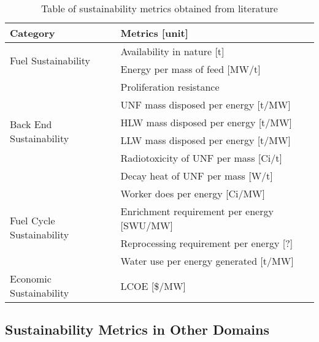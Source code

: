 \documentclass{article}
\begin{document}
\begin{table}[h]
    \centering
    \begin{tabularx}{\textwidth}{lb}

    \hline

    \textbf{Category} & \textbf{Metrics [unit]} \\

    \hline
    \hline

    \multirow{2}{*}{Fuel Sustainability} 
     & Availability in nature [t] \\
     & Energy per mass of feed [MW/t] \\
    
    \hline

    \multirow{6}{*}{Back End Sustainability} 
     & Proliferation resistance \\
     & \gls{UNF} mass disposed per energy [t/MW] \\
     & \gls{HLW} mass disposed per energy [t/MW] \\
     & \gls{LLW} mass disposed per energy [t/MW] \\
     & Radiotoxicity of \gls{UNF} per mass [Ci/t] \\
     & Decay heat of \gls{UNF} per mass [W/t] \\

    \hline

    \multirow{4}{*}{Fuel Cycle Sustainability}
     & Worker does per energy [Ci/MW] \\
     & Enrichment requirement per energy [SWU/MW] \\
     & Reprocessing requirement per energy [?] \\
     & Water use per energy generated [t/MW] \\
    \hline

    Economic Sustainability
     & \gls{LCOE} [\$/MW] \\

    \hline
    \end{tabularx}
    \caption {Table of sustainability metrics obtained from literature \cite{wigeland_nuclear_2014} \cite{gonzalez_methodology_2003} \cite{allibert_introduction_2015}}
    \label{tab:sus_met}
\end{table}

\subsection{Sustainability Metrics in Other Domains}
\end{document}
